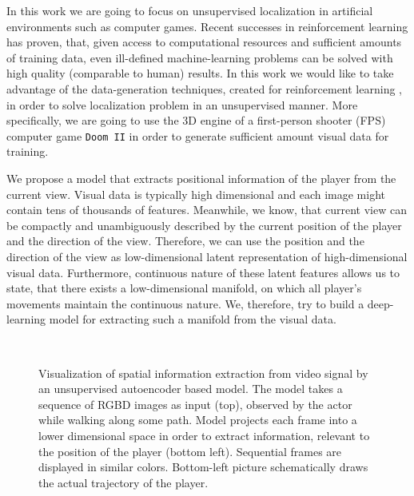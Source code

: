 In this work we are going to focus on unsupervised localization in artificial environments such as computer games. Recent successes in reinforcement learning \cite{Silver, Lample2016} has proven, that, given access to computational resources and sufficient amounts of training data, even ill-defined machine-learning problems can be solved with high quality (comparable to human) results. In this work we would like to take advantage of the data-generation techniques, created for reinforcement learning \cite{Brockman2016, Kempka2016}, in order to solve localization problem in an unsupervised manner. More specifically, we are going to use the 3D engine of a first-person shooter (FPS) computer game \texttt{Doom II} in order to generate sufficient amount visual data for training.

We propose a model that extracts positional information of the player from the current view.
Visual data is typically high dimensional and each image might contain tens of thousands of features. Meanwhile, we know, that current view can be compactly and unambiguously described by the current position of the player and the direction of the view. Therefore, we can use the position and the direction of the view as low-dimensional latent representation of high-dimensional visual data. Furthermore, continuous nature of these latent features allows us to state, that there exists a low-dimensional manifold, on which all player's movements maintain the continuous nature. We, therefore, try to build a deep-learning model for extracting such a manifold from the visual data.

\begin{figure}[t!]
	\centering
	\\
    	\caption{Visualization of spatial information extraction from video signal by an unsupervised autoencoder based model. The model takes a sequence of RGBD images as input (top), observed by the actor while walking along some path. Model projects each frame into a lower dimensional space in order to extract information, relevant to the position of the player (bottom left). Sequential frames are displayed in similar colors. Bottom-left picture schematically draws the actual trajectory of the player.}
    	\label{fig:intro_ex}
\end{figure}

